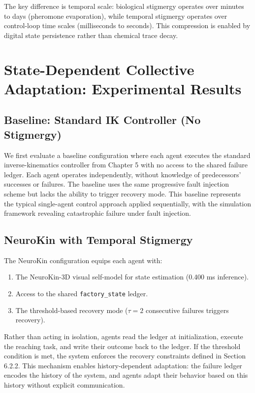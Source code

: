 \documentclass[12pt,a4paper,oneside]{report}
\begin{document}
The key difference is temporal scale: biological stigmergy operates over minutes to days (pheromone evaporation), while temporal stigmergy operates over control-loop time scales (milliseconds to seconds). This compression is enabled by digital state persistence rather than chemical trace decay.

\section{State-Dependent Collective Adaptation: Experimental Results}

\subsection{Baseline: Standard IK Controller (No Stigmergy)}

We first evaluate a baseline configuration where each agent executes the standard inverse-kinematics controller from Chapter 5 with no access to the shared failure ledger. Each agent operates independently, without knowledge of predecessors' successes or failures. The baseline uses the same progressive fault injection scheme but lacks the ability to trigger recovery mode. This baseline represents the typical single-agent control approach applied sequentially, with the simulation framework revealing catastrophic failure under fault injection.

\subsection{NeuroKin with Temporal Stigmergy}

The NeuroKin configuration equips each agent with:
\begin{enumerate}
    \item The NeuroKin-3D visual self-model for state estimation (0.400 ms inference).
    \item Access to the shared \texttt{factory\_state} ledger.
    \item The threshold-based recovery mode ($\tau = 2$ consecutive failures triggers recovery).
\end{enumerate}

Rather than acting in isolation, agents read the ledger at initialization, execute the reaching task, and write their outcome back to the ledger. If the threshold condition is met, the system enforces the recovery constraints defined in Section 6.2.2. This mechanism enables history-dependent adaptation: the failure ledger encodes the history of the system, and agents adapt their behavior based on this history without explicit communication.
\end{document}
